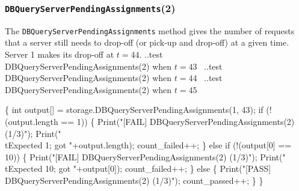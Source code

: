 \documentclass{article}
\def\nwendcode{\endtrivlist \endgroup}
\let\nwdocspar=\par
\begin{document}
\subsubsection{{\tt{}DBQueryServerPendingAssignments}(2)}
The {\tt{}DBQueryServerPendingAssignments} method gives the number of requests that
a server still needs to drop-off (or pick-up and drop-off) at a given time.
Server 1 makes its drop-off at $t=44$.
\nwenddocs{}\endmoddef{}
  \LA{}..test \code{}DBQueryServerPendingAssignments\edoc{}(2) when $t=43$~{\nwtagstyle{}}\RA{}
  \LA{}..test \code{}DBQueryServerPendingAssignments\edoc{}(2) when $t=44$~{\nwtagstyle{}}\RA{}
  \LA{}..test \code{}DBQueryServerPendingAssignments\edoc{}(2) when $t=45$~{\nwtagstyle{}}\RA{}
\nwendcode{}\nwdocspar
\nwenddocs{}\endmoddef{}
\{
  int output[] = storage.DBQueryServerPendingAssignments(1, 43);
  if (!(output.length == 1)) \{
    Print("[FAIL] DBQueryServerPendingAssignments(2) (1/3)");
    Print("\\tExpected 1; got "+output.length);
    count_failed++;
  \} else if (!(output[0] == 10)) \{
    Print("[FAIL] DBQueryServerPendingAssignments(2) (1/3)");
    Print("\\tExpected 10; got "+output[0]);
    count_failed++;
  \} else \{
    Print("[PASS] DBQueryServerPendingAssignments(2) (1/3)");
    count_passed++;
  \}
\}
\nwendcode{}\nwdocspar
\nwenddocs{}\endmoddef{}
\end{document}
